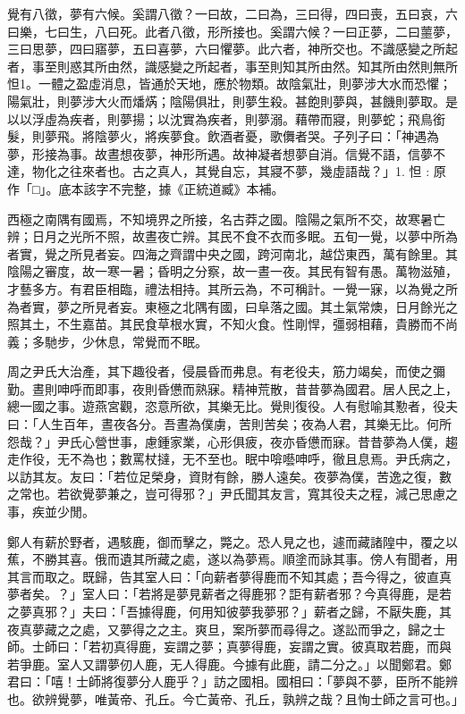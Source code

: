 \begin{pinyinscope}
覺有八徵，夢有六候。奚謂八徵？一曰故，二曰為，三曰得，四曰喪，五曰哀，六曰樂，七曰生，八曰死。此者八徵，形所接也。奚謂六候？一曰正夢，二曰蘁夢，三曰思夢，四曰寤夢，五曰喜夢，六曰懼夢。此六者，神所交也。不識感變之所起者，事至則惑其所由然，識感變之所起者，事至則知其所由然。知其所由然則無所怛1。一體之盈虛消息，皆通於天地，應於物類。故陰氣壯，則夢涉大水而恐懼；陽氣壯，則夢涉大火而燔焫；陰陽俱壯，則夢生殺。甚飽則夢與，甚饑則夢取。是以以浮虛為疾者，則夢揚；以沈實為疾者，則夢溺。藉帶而寢，則夢蛇；飛鳥銜髮，則夢飛。將陰夢火，將疾夢食。飲酒者憂，歌儛者哭。子列子曰：「神遇為夢，形接為事。故晝想夜夢，神形所遇。故神凝者想夢自消。信覺不語，信夢不達，物化之往來者也。古之真人，其覺自忘，其寢不夢，幾虛語哉？」1. 怛 : 原作「□」。底本該字不完整，據《正統道臧》本補。

西極之南隅有國焉，不知境界之所接，名古莽之國。陰陽之氣所不交，故寒暑亡辨；日月之光所不照，故晝夜亡辨。其民不食不衣而多眠。五旬一覺，以夢中所為者實，覺之所見者妄。四海之齊謂中央之國，跨河南北，越岱東西，萬有餘里。其陰陽之審度，故一寒一暑；昏明之分察，故一晝一夜。其民有智有愚。萬物滋殖，才藝多方。有君臣相臨，禮法相持。其所云為，不可稱計。一覺一寐，以為覺之所為者實，夢之所見者妄。東極之北隅有國，曰阜落之國。其土氣常燠，日月餘光之照其土，不生嘉苗。其民食草根水實，不知火食。性剛悍，彊弱相藉，貴勝而不尚義；多馳步，少休息，常覺而不眠。

周之尹氏大治產，其下趣役者，侵晨昏而弗息。有老役夫，筋力竭矣，而使之彌勤。晝則呻呼而即事，夜則昏憊而熟寐。精神荒散，昔昔夢為國君。居人民之上，總一國之事。遊燕宮觀，恣意所欲，其樂无比。覺則復役。人有慰喻其懃者，役夫曰：「人生百年，晝夜各分。吾晝為僕虜，苦則苦矣；夜為人君，其樂无比。何所怨哉？」尹氏心營世事，慮鍾家業，心形俱疲，夜亦昏憊而寐。昔昔夢為人僕，趨走作役，无不為也；數罵杖撻，无不至也。眠中啽囈呻呼，徹且息焉。尹氏病之，以訪其友。友曰：「若位足榮身，資財有餘，勝人遠矣。夜夢為僕，苦逸之復，數之常也。若欲覺夢兼之，豈可得邪？」尹氏聞其友言，寬其役夫之程，減己思慮之事，疾並少閒。

鄭人有薪於野者，遇駭鹿，御而擊之，斃之。恐人見之也，遽而藏諸隍中，覆之以蕉，不勝其喜。俄而遺其所藏之處，遂以為夢焉。順塗而詠其事。傍人有聞者，用其言而取之。既歸，告其室人曰：「向薪者夢得鹿而不知其處；吾今得之，彼直真夢者矣。？」室人曰：「若將是夢見薪者之得鹿邪？詎有薪者邪？今真得鹿，是若之夢真邪？」夫曰：「吾據得鹿，何用知彼夢我夢邪？」薪者之歸，不厭失鹿，其夜真夢藏之之處，又夢得之之主。爽旦，案所夢而尋得之。遂訟而爭之，歸之士師。士師曰：「若初真得鹿，妄謂之夢；真夢得鹿，妄謂之實。彼真取若鹿，而與若爭鹿。室人又謂夢仞人鹿，无人得鹿。今據有此鹿，請二分之。」以聞鄭君。鄭君曰：「嘻！士師將復夢分人鹿乎？」訪之國相。國相曰：「夢與不夢，臣所不能辨也。欲辨覺夢，唯黃帝、孔丘。今亡黃帝、孔丘，孰辨之哉？且恂士師之言可也。」


\end{pinyinscope}
